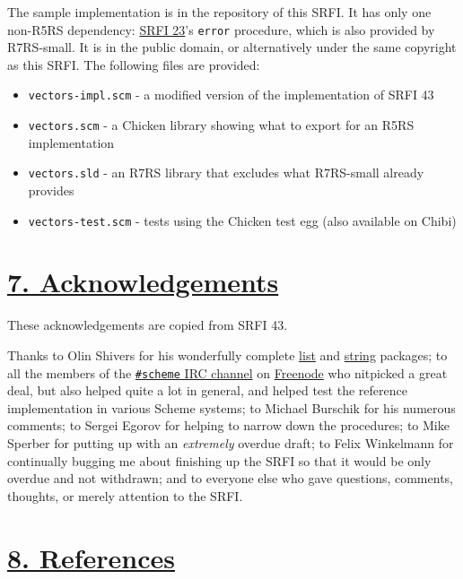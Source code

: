 The sample implementation is in the repository of this SRFI. It has only
one non-R5RS dependency: \protect\hyperlink{SRFI-23}{SRFI 23}'s
\texttt{error} procedure, which is also provided by R7RS-small. It is in
the public domain, or alternatively under the same copyright as this
SRFI. The following files are provided:

\begin{itemize}
\tightlist
\item
  \texttt{vectors-impl.scm} - a modified version of the implementation
  of SRFI 43
\item
  \texttt{vectors.scm} - a Chicken library showing what to export for an
  R5RS implementation
\item
  \texttt{vectors.sld} - an R7RS library that excludes what R7RS-small
  already provides
\item
  \texttt{vectors-test.scm} - tests using the Chicken test egg (also
  available on Chibi)
\end{itemize}

\section{\texorpdfstring{\href{}{7.
Acknowledgements}}{7. Acknowledgements}}\label{acknowledgements}

These acknowledgements are copied from SRFI 43.

Thanks to Olin Shivers for his wonderfully complete
\protect\hyperlink{SRFI-1}{list} and \protect\hyperlink{SRFI-13}{string}
packages; to all the members of the
\href{http://scheme-irc.webhop.org/}{\texttt{\#scheme} IRC channel} on
\href{http://www.freenode.net/}{Freenode} who nitpicked a great deal,
but also helped quite a lot in general, and helped test the reference
implementation in various Scheme systems; to Michael Burschik for his
numerous comments; to Sergei Egorov for helping to narrow down the
procedures; to Mike Sperber for putting up with an \emph{extremely}
overdue draft; to Felix Winkelmann for continually bugging me about
finishing up the SRFI so that it would be only overdue and not
withdrawn; and to everyone else who gave questions, comments, thoughts,
or merely attention to the SRFI.

\section{\texorpdfstring{\href{}{8.
References}}{8. References}}\label{references}

